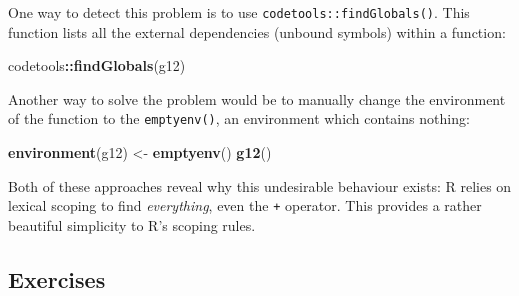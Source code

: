 \documentclass[]{book}
\newenvironment{Shaded}{\begin{snugshade}}{\end{snugshade}}
\newcommand{\KeywordTok}[1]{\textcolor[rgb]{0.13,0.29,0.53}{\textbf{#1}}}
\newcommand{\NormalTok}[1]{#1}
\newcommand{\OperatorTok}[1]{\textcolor[rgb]{0.81,0.36,0.00}{\textbf{#1}}}
\newcommand{\StringTok}[1]{\textcolor[rgb]{0.31,0.60,0.02}{#1}}
\theoremstyle{definition}
\theoremstyle{definition}
\theoremstyle{definition}
\theoremstyle{remark}
\begin{document}
One way to detect this problem is to use
\texttt{codetools::findGlobals()}. This function lists all the external
dependencies (unbound symbols) within a function:

\begin{Shaded}
\begin{Highlighting}[]
\NormalTok{codetools}\OperatorTok{::}\KeywordTok{findGlobals}\NormalTok{(g12)}
\end{Highlighting}
\end{Shaded}

Another way to solve the problem would be to manually change the
environment of the function to the \texttt{emptyenv()}, an environment
which contains nothing:

\begin{Shaded}
\begin{Highlighting}[]
\KeywordTok{environment}\NormalTok{(g12) <-}\StringTok{ }\KeywordTok{emptyenv}\NormalTok{()}
\KeywordTok{g12}\NormalTok{()}
\end{Highlighting}
\end{Shaded}

Both of these approaches reveal why this undesirable behaviour exists: R
relies on lexical scoping to find \emph{everything}, even the \texttt{+}
operator. This provides a rather beautiful simplicity to R's scoping
rules.

\hypertarget{exercises-1}{%
\subsection{Exercises}\label{exercises-1}}
\end{document}
